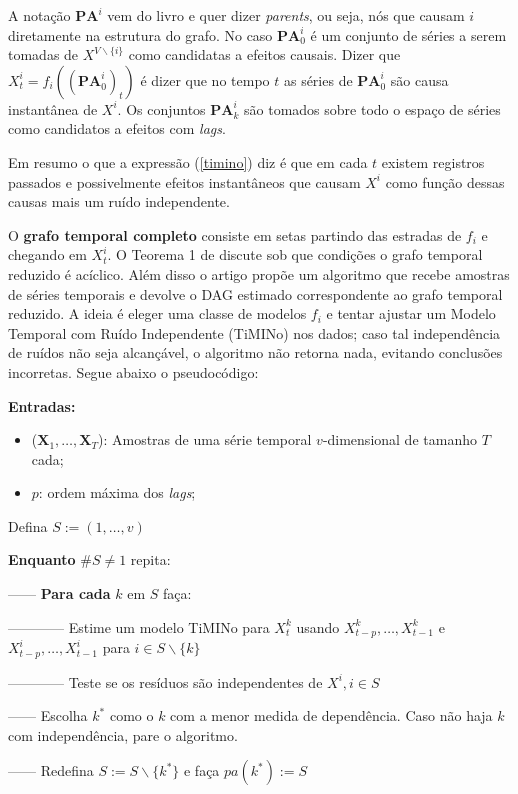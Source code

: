\documentclass[12pt,letterpaper]{article}
\newcommand{\bd}[1]{\boldsymbol{#1}}
\begin{document}
	A notação $\bd{PA}^i$ vem do livro \cite{pearl2009causality} e quer dizer \textit{parents}, ou seja, nós que causam $i$ diretamente na estrutura do grafo. No caso $\bd{PA}^i_0$ é um conjunto de séries a serem tomadas de $X^{V\backslash \{i\}}$ como candidatas a efeitos causais. Dizer que $X^i_t=f_i((\bd{PA}^i_0)_t)$ é dizer que no tempo $t$ as séries de $\bd{PA}^i_0$ são causa instantânea de $X^i$. Os conjuntos $\bd{PA}^{i}_{k}$ são tomados sobre todo o espaço de séries como candidatos a efeitos com \textit{lags}. 
	
	Em resumo o que a expressão (\ref{timino}) diz é que em cada $t$ existem registros passados e possivelmente efeitos instantâneos que causam $X^i$ como função dessas causas mais um ruído independente.
	
	O \textbf{grafo temporal completo} consiste em setas partindo das estradas de $f_i$ e chegando em $X^i_t$. O Teorema 1 de \cite{Peters2012phd} discute sob que condições o grafo temporal reduzido é acíclico. Além disso o artigo propõe um algoritmo que recebe amostras de séries temporais e devolve o DAG estimado correspondente ao grafo temporal reduzido. A ideia é eleger uma classe de modelos $f_i$ e tentar ajustar um Modelo Temporal com Ruído Independente (TiMINo) nos dados; caso tal independência de ruídos não seja alcançável, o algoritmo não retorna nada, evitando conclusões incorretas. Segue abaixo o pseudocódigo:
	
	\textbf{Entradas:} 
	\begin{itemize}
		\item ($\bd X_1,\ldots,\bd X_T$): Amostras de uma série temporal $v$-dimensional de tamanho $T$ cada;
		\item  $p$: ordem máxima dos \textit{lags};
	\end{itemize}
	Defina $S:=(1,\ldots,v)$
	
	\textbf{Enquanto} $\# S\neq1$ repita:
	
	------ \textbf{Para cada} $k$ em $S$ faça:
	
	------------ Estime um modelo TiMINo para $X^k_t$ usando $X^k_{t-p},\ldots,X^k_{t-1}$ e $X^i_{t-p},\ldots,X^i_{t-1}$ para $i\in S\backslash \{k\}$
	
	------------ Teste se os resíduos são independentes de $X^i,i\in S$ 
	
	 
	------ Escolha $k^*$ como o $k$ com a menor medida de dependência. Caso não haja $k$ com independência, pare o algoritmo.
	
	------ Redefina $S:=S\backslash \{k^*\}$ e faça $pa(k^*):=S$
	
\end{document}
